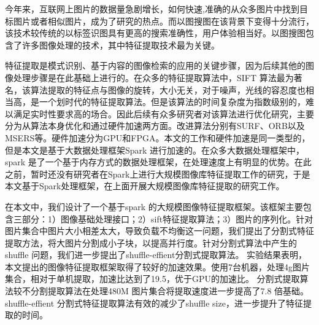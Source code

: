 ﻿\begin{cabstract}
今年来，互联网上图片的数据量急剧增长，如何快速,准确的从众多图片中找到目标图片或者相似图片，成为了研究的热点。而以图搜图在该背景下变得十分流行，该技术较传统的以标签识图具有更高的搜索准确性，用户体验相当好。以图搜图包含了许多图像处理的技术，其中特征提取技术最为关键。

特征提取是模式识别、基于内容的图像检索的应用的关键步骤，因为后续其他的图像处理步骤是在此基础上进行的。在众多的特征提取算法中，SIFT 算法最为著名，该算法提取的特征点与图像的旋转，大小无关，对于噪声，光线的容忍度也相当高，是一个划时代的特征提取算法。但是该算法的时间复杂度为指数级别的，难以满足实时性要求高的场合。因此后续有众多研究者对该算法进行优化研究，主要分为从算法本身优化和通过硬件加速两方面。改进算法分别有SURF、ORB以及MSERS等。硬件加速分为GPU和FPGA。本文的工作和硬件加速是同一类型的，但是本文是基于大数据处理框架Spark 进行加速的。在众多大数据处理框架中，spark 是了一个基于内存方式的数据处理框架，在处理速度上有明显的优势。在此之前，暂时还没有研究者在Spark上进行大规模图像库特征提取工作的研究，于是本文基于Spark处理框架，在上面开展大规模图像库特征提取的研究工作。

在本文中，我们设计了一个基于spark 的大规模图像特征提取框架。该框架主要包含三部分：1）图像基础处理接口；2）sift特征提取算法；3）图片的序列化。针对图片集合中图片大小相差太大，导致负载不均衡这一问题，我们提出了分割式特征提取方法，将大图片分割成小子块，以提高并行度。针对分割式算法中产生的shuffle 问题，我们进一步提出了shuffle-effient分割式提取算法。 实验结果表明，本文提出的图像特征提取框架取得了较好的加速效果。使用7台机器，处理4g图片集合，相对于单机提取，加速比达到了19.5，优于GPU的加速比。 分割式提取算法较不分割提取算法在处理480M 图片集合将提取速度进一步提高了7.8 倍基础。shuffle-effient 分割式特征提取算法有效的减少了shuffle size，进一步提升了特征提取的时间。
\end{cabstract}

